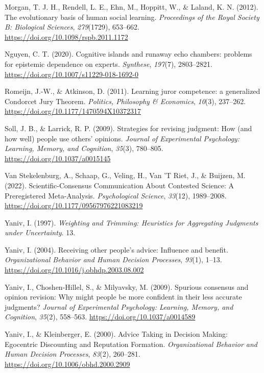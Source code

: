 \documentclass[
  doc,floatsintext]{apa6}
\newlength{\cslhangindent}
\newenvironment{CSLReferences}[2] %
 {\begin{list}{}{%
  \setlength{\itemindent}{0pt}
  \setlength{\leftmargin}{0pt}
  \setlength{\parsep}{0pt}
  \ifodd #1
   \setlength{\leftmargin}{\cslhangindent}
   \setlength{\itemindent}{-1\cslhangindent}
  \fi
  \setlength{\itemsep}{#2\baselineskip}}}
 {\end{list}}
\begin{document}
\begin{CSLReferences}{1}{0}
Morgan, T. J. H., Rendell, L. E., Ehn, M., Hoppitt, W., \& Laland, K. N. (2012). The evolutionary basis of human social learning. \emph{Proceedings of the Royal Society B: Biological Sciences}, \emph{279}(1729), 653--662. \url{https://doi.org/10.1098/rspb.2011.1172}

Nguyen, C. T. (2020). Cognitive islands and runaway echo chambers: problems for epistemic dependence on experts. \emph{Synthese}, \emph{197}(7), 2803--2821. \url{https://doi.org/10.1007/s11229-018-1692-0}

Romeijn, J.-W., \& Atkinson, D. (2011). Learning juror competence: a generalized Condorcet Jury Theorem. \emph{Politics, Philosophy \& Economics}, \emph{10}(3), 237--262. \url{https://doi.org/10.1177/1470594X10372317}

Soll, J. B., \& Larrick, R. P. (2009). Strategies for revising judgment: How (and how well) people use others{'} opinions. \emph{Journal of Experimental Psychology: Learning, Memory, and Cognition}, \emph{35}(3), 780--805. \url{https://doi.org/10.1037/a0015145}

Van Stekelenburg, A., Schaap, G., Veling, H., Van 'T Riet, J., \& Buijzen, M. (2022). Scientific-Consensus Communication About Contested Science: A Preregistered Meta-Analysis. \emph{Psychological Science}, \emph{33}(12), 1989--2008. \url{https://doi.org/10.1177/09567976221083219}

Yaniv, I. (1997). \emph{Weighting and Trimming: Heuristics for Aggregating Judgments under Uncertainty}. 13.

Yaniv, I. (2004). Receiving other people{'}s advice: Influence and benefit. \emph{Organizational Behavior and Human Decision Processes}, \emph{93}(1), 1--13. \url{https://doi.org/10.1016/j.obhdp.2003.08.002}

Yaniv, I., Choshen-Hillel, S., \& Milyavsky, M. (2009). Spurious consensus and opinion revision: Why might people be more confident in their less accurate judgments? \emph{Journal of Experimental Psychology: Learning, Memory, and Cognition}, \emph{35}(2), 558--563. \url{https://doi.org/10.1037/a0014589}

Yaniv, I., \& Kleinberger, E. (2000). Advice Taking in Decision Making: Egocentric Discounting and Reputation Formation. \emph{Organizational Behavior and Human Decision Processes}, \emph{83}(2), 260--281. \url{https://doi.org/10.1006/obhd.2000.2909}

\end{CSLReferences}
\end{document}
